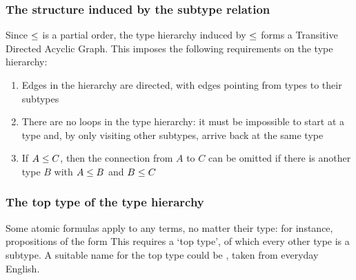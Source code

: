 \documentclass[../main.tex]{subfiles}
\begin{document}
\subsubsection{The structure induced by the subtype relation}
Since $\leq$ is a partial order, the type hierarchy induced by $\leq$ forms a Transitive Directed Acyclic Graph\cite[p.~49]{poset_dag}. This imposes the following requirements on the type hierarchy:
\begin{enumerate}
    \item Edges in the hierarchy are directed, with edges pointing from types to their subtypes
    \item There are no loops in the type hierarchy: it must be impossible to start at a type and, by only visiting other subtypes, arrive back at the same type
    \item If $A \leq C$, then the connection from $A$ to $C$ can be omitted if there is another type $B$ with $A \leq B$ and $B \leq C$
\end{enumerate}


\subsubsection{The top type of the type hierarchy}
Some atomic formulas apply to any terms, no matter their type: for instance, propositions of the form  This requires a `top type', of which every other type is a subtype. A suitable name for the top type could be , taken from everyday English. 
\end{document}
